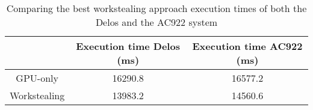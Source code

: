 \begin{table}[H]
  \centering
  \begin{tabular}{||c | c | c||} 
   \hline
    & Execution time Delos (ms) & Execution time AC922 (ms) \\ [0.5ex] 
   \hline\hline
   GPU-only & 16290.8 & 16577.2 \\
   Workstealing & 13983.2 & 14560.6 \\ [1ex] 
   \hline
  \end{tabular}
  \caption{Comparing the best workstealing approach execution times of both the Delos and the AC922 system}
  \label{table:ac922_vs_delos}
\end{table}